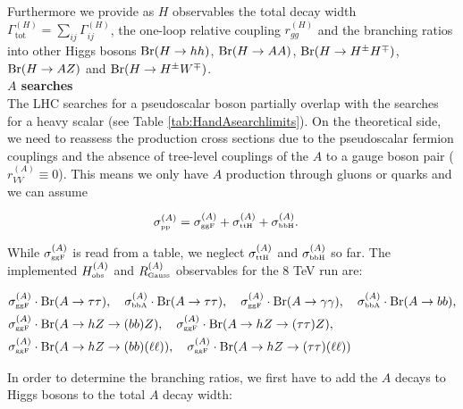 \documentclass[preprint,3p,12pt]{elsarticle}
\begin{document}
Furthermore we provide as $H$ observables the total decay width $\Gamma^{(H)}_{\text{tot}}=\sum_{ij}\Gamma_{ij}^{(H)}$, the one-loop relative coupling $r_{gg}^{(H)}$ and the branching ratios into other Higgs bosons ${\rm Br}(H\to hh)$, ${\rm Br}(H\to AA)$, ${\rm Br}(H\to H^\pm H^\mp )$, ${\rm Br}(H\to AZ)$ and ${\rm Br}(H\to H^\pm W^\mp )$.\\

\textbf{$A$ searches}\\

The LHC searches for a pseudoscalar boson partially overlap with the searches for a heavy scalar (see Table \ref{tab:HandAsearchlimits}). On the theoretical side, we need to reassess the production cross sections due to the pseudoscalar fermion couplings and the absence of tree-level couplings of the $A$ to a gauge boson pair ($r_{VV}^{(A)}\equiv 0$). This means we only have $A$ production through gluons or quarks and we can assume

\begin{align}
 \sigma ^{(A)}_{\text{\tiny{pp}}} &= \sigma ^{(A)}_{\text{\tiny{ggF}}} + \sigma ^{(A)}_{\text{\tiny{ttH}}} + \sigma ^{(A)}_{\text{\tiny{bbH}}} .\nonumber
\end{align}

While $\sigma ^{(A)}_{\text{\tiny{ggF}}}$ %
is read from a table, we neglect $\sigma ^{(A)}_{\text{\tiny{ttH}}}$ and $\sigma ^{(A)}_{\text{\tiny{bbH}}}$ so far. The implemented $H^{(A)}_\text{\tiny obs}$ and $R^{(A)}_\text{\tiny Gauss}$ observables for the 8 TeV run are:

\begin{align}
&\sigma ^{(A)}_{\text{\tiny{ggF}}} \cdot {\rm Br}(A\to \tau \tau ) , \quad \sigma ^{(A)}_{\text{\tiny{bbA}}} \cdot {\rm Br}(A\to \tau \tau ), \quad\sigma ^{(A)}_{\text{\tiny{ggF}}} \cdot {\rm Br}(A\to \gamma \gamma ) ,  \quad  \sigma ^{(A)}_{\text{\tiny{bbA}}} \cdot {\rm Br}(A\to bb), \nonumber \\%
&\sigma ^{(A)}_{\text{\tiny{ggF}}} \cdot {\rm Br}(A\to hZ \to (bb)Z),  \quad  \sigma ^{(A)}_{\text{\tiny{ggF}}} \cdot {\rm Br}(A\to hZ \to (\tau \tau )Z), \nonumber \\ %
&\sigma ^{(A)}_{\text{\tiny{ggF}}} \cdot {\rm Br}(A\to hZ \to (bb)(\ell \ell )),  \quad \sigma ^{(A)}_{\text{\tiny{ggF}}} \cdot {\rm Br}(A\to hZ \to (\tau \tau )(\ell \ell )) \nonumber %
\end{align}

In order to determine the branching ratios, we first have to add the $A$ decays to Higgs bosons to the total $A$ decay width:
\end{document}
